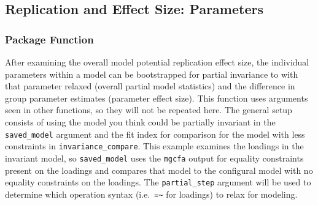 \documentclass[
  man]{apa7}
\begin{document}
\hypertarget{replication-and-effect-size-parameters}{%
\subsection{Replication and Effect Size: Parameters}\label{replication-and-effect-size-parameters}}

\hypertarget{package-function-3}{%
\subsubsection{Package Function}\label{package-function-3}}

After examining the overall model potential replication effect size, the individual parameters within a model can be bootstrapped for partial invariance to with that parameter relaxed (overall partial model statistics) and the difference in group parameter estimates (parameter effect size). This function uses arguments seen in other functions, so they will not be repeated here. The general setup consists of using the model you think could be partially invariant in the \texttt{saved\_model} argument and the fit index for comparison for the model with less constraints in \texttt{invariance\_compare}. This example examines the loadings in the invariant model, so \texttt{saved\_model} uses the \texttt{mgcfa} output for equality constraints present on the loadings and compares that model to the configural model with no equality constraints on the loadings. The \texttt{partial\_step} argument will be used to determine which operation syntax (i.e.~\texttt{=\textasciitilde{}} for loadings) to relax for modeling.

\small
\end{document}
